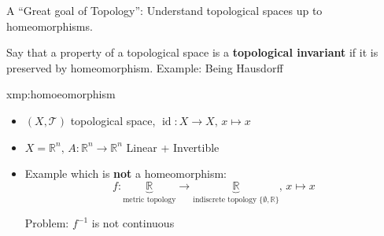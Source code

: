 \documentclass{article}
\DeclareMathOperator{\id}{id}
\begin{document}
A ``Great goal of Topology'': Understand topological spaces up to homeomorphisms.

Say that a property of a topological space is a \textbf{topological invariant} if it is preserved by homeomorphism. Example: Being Hausdorff

\begin{xmp}{xmp:homoeomorphism}{}
    \begin{itemize}
        \item $(X, \mathcal{T})$ topological space, $\id : X \to X,\,x \mapsto x$
        \item $X = \mathbb{R}^{n},\, A : \mathbb{R}^{n} \to \mathbb{R}^{n}$ Linear + Invertible
        \item Example which is \textbf{not} a homeomorphism:
            \[f : \underbrace{\mathbb{R}}_{\text{metric topology}} \to \underbrace{\mathbb{R}}_{\text{indiscrete topology $\{\emptyset, \mathbb{R}\}$}},\,x \mapsto x\]

            Problem: $f^{-1}$ is not continuous
    \end{itemize}
\end{xmp}
\end{document}
